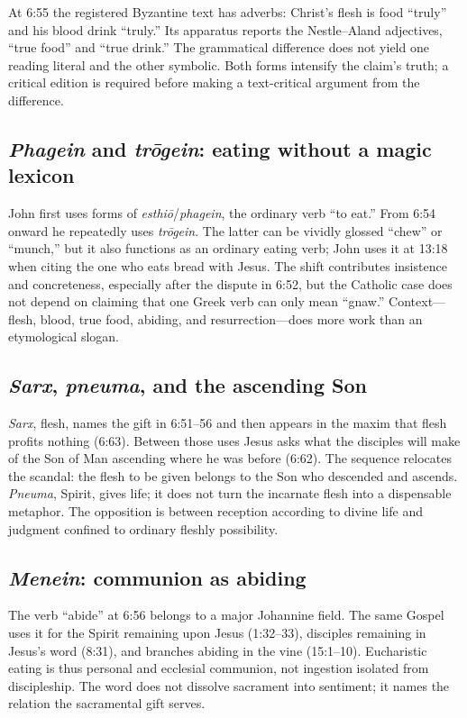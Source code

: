 \begin{deepstudy}
At 6:55 the registered Byzantine text has adverbs: Christ's flesh is food
``truly'' and his blood drink ``truly.'' Its apparatus reports the
Nestle--Aland adjectives, ``true food'' and ``true drink.'' The grammatical
difference does not yield one reading literal and the other symbolic. Both
forms intensify the claim's truth; a critical edition is required before
making a text-critical argument from the difference.

\subsection{\emph{Phagein} and \emph{tr\=ogein}: eating without a magic lexicon}

John first uses forms of \emph{esthi\=o}/\emph{phagein}, the ordinary verb ``to
eat.'' From 6:54 onward he repeatedly uses \emph{tr\=ogein}. The latter can be
vividly glossed ``chew'' or ``munch,'' but it also functions as an ordinary
eating verb; John uses it at 13:18 when citing the one who eats bread with
Jesus. The shift contributes insistence and concreteness, especially after the
dispute in 6:52, but the Catholic case does not depend on claiming that one
Greek verb can only mean ``gnaw.'' Context---flesh, blood, true food, abiding,
and resurrection---does more work than an etymological slogan.

\subsection{\emph{Sarx}, \emph{pneuma}, and the ascending Son}

\emph{Sarx}, flesh, names the gift in 6:51--56 and then appears in the maxim
that flesh profits nothing (6:63). Between those uses Jesus asks what the
disciples will make of the Son of Man ascending where he was before (6:62).
The sequence relocates the scandal: the flesh to be given belongs to the Son
who descended and ascends. \emph{Pneuma}, Spirit, gives life; it does not turn
the incarnate flesh into a dispensable metaphor. The opposition is between
reception according to divine life and judgment confined to ordinary fleshly
possibility.

\subsection{\emph{Menein}: communion as abiding}

The verb ``abide'' at 6:56 belongs to a major Johannine field. The same Gospel
uses it for the Spirit remaining upon Jesus (1:32--33), disciples remaining in
Jesus's word (8:31), and branches abiding in the vine (15:1--10). Eucharistic
eating is thus personal and ecclesial communion, not ingestion isolated from
discipleship. The word does not dissolve sacrament into sentiment; it names the
relation the sacramental gift serves.


\end{deepstudy}
